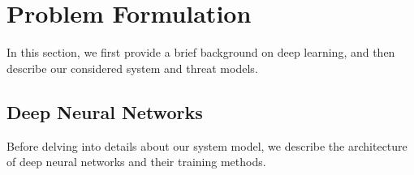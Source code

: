 \documentclass[conference]{IEEEtran}
\begin{document}


\section{Problem Formulation}
In this section, we first provide a brief background on deep learning, and then describe our considered system and threat models. 


\subsection{Deep Neural Networks}
Before delving into details about our system model, we describe the architecture of deep neural networks and their training methods. 
\end{document}
